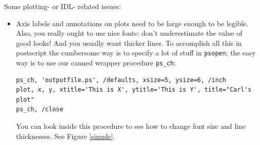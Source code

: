 \documentclass[12pt,preprint]{aastex}
\begin{document}
	Some plotting- or IDL- related issues: \begin{itemize}

	\item Axis labels and annotations on plots need to be large
enough to be legible.  Also, you really ought to use nice fonts: don't
underestimate the value of good looks! And you usually want thicker
lines. To accomplish all this in postscript the cumbersome way is to
specify a lot of stuff in {\tt psopen}; the easy way is to use our canned
wrapper procedure {\tt ps\_ch}:

\begin{verbatim}
ps_ch, 'outputfile.ps', /defaults, xsize=5, ysize=6, /inch
plot, x, y, xtitle='This is X', ytitle='This is Y', title="Carl's plot"
ps_ch, /close
\end{verbatim}

\noindent You can look inside this procedure to see how to change font
size and line thicknesses. See Figure \ref{simple}.


\end{itemize}
\end{document}
